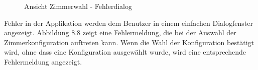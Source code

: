 \begin{figure}[h]
\begin{minipage}[b]{0.45\textwidth}
        \caption{Ansicht Zimmerwahl - Fehlerdialog}
    \end{minipage}
    \label{fig:MobileClient-Screens4}
\end{figure}

Fehler in der Applikation werden dem Benutzer in einem einfachen Dialogfenster angezeigt.
Abbildung 8.8 zeigt eine Fehlermeldung, die bei der Auswahl der Zimmerkonfiguration auftreten kann.
Wenn die Wahl der Konfiguration bestätigt wird, ohne dass eine Konfiguration ausgewählt wurde, wird eine entsprechende Fehlermeldung angezeigt.

\clearpage


